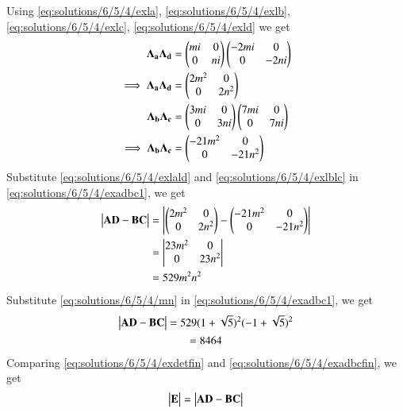 Using \eqref{eq:solutions/6/5/4/exla}, \eqref{eq:solutions/6/5/4/exlb}, \eqref{eq:solutions/6/5/4/exlc}, \eqref{eq:solutions/6/5/4/exld} we get
\begin{align}
    \mathbf{\Lambda_a}\mathbf{\Lambda_d}&=\begin{pmatrix}mi&0\\0&ni\end{pmatrix}\begin{pmatrix}-2mi&0\\0&-2ni\end{pmatrix}\\
    \implies\mathbf{\Lambda_a}\mathbf{\Lambda_d}&=\begin{pmatrix}2m^2&0\\0&2n^2\end{pmatrix}\label{eq:solutions/6/5/4/exlald}\\
    \mathbf{\Lambda_b}\mathbf{\Lambda_c}&=\begin{pmatrix}3mi&0\\0&3ni\end{pmatrix}\begin{pmatrix}7mi&0\\0&7ni\end{pmatrix}\\
    \implies\mathbf{\Lambda_b}\mathbf{\Lambda_c}&=\begin{pmatrix}-21m^2&0\\0&-21n^2\end{pmatrix}\label{eq:solutions/6/5/4/exlblc}
\end{align}
Substitute \eqref{eq:solutions/6/5/4/exlald} and \eqref{eq:solutions/6/5/4/exlblc} in \eqref{eq:solutions/6/5/4/exadbc1}, we get
\begin{align}
    \begin{vmatrix}\mathbf{A}\mathbf{D}-\mathbf{B}\mathbf{C}\end{vmatrix}&=\begin{vmatrix}\begin{pmatrix}2m^2&0\\0&2n^2\end{pmatrix}-\begin{pmatrix}-21m^2&0\\0&-21n^2\end{pmatrix}\end{vmatrix}\\
    &=\begin{vmatrix}23m^2&0\\0&23n^2\end{vmatrix}\\
    &=529m^2n^2
\end{align}
Substitute \eqref{eq:solutions/6/5/4/mn} in \eqref{eq:solutions/6/5/4/exadbc1}, we get
\begin{multline}
    \begin{vmatrix}\mathbf{A}\mathbf{D}-\mathbf{B}\mathbf{C}\end{vmatrix}=529(1+\sqrt{5})^2(-1+\sqrt{5})^2\\=8464\label{eq:solutions/6/5/4/exadbcfin}
\end{multline}
Comparing \eqref{eq:solutions/6/5/4/exdetfin} and \eqref{eq:solutions/6/5/4/exadbcfin}, we get
\begin{align}
    \begin{vmatrix}\mathbf{E}\end{vmatrix}=\begin{vmatrix}\mathbf{A}\mathbf{D}-\mathbf{B}\mathbf{C}\end{vmatrix}
\end{align}
